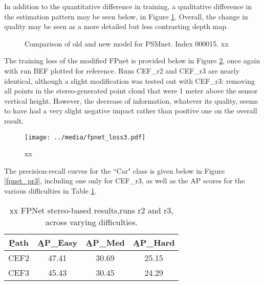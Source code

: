 In addition to the quantitative difference in training, a qualitative difference in the estimation pattern may be seen below, in Figure \ref{new_psmnet}. Overall, the change in quality may be seen as a more detailed but less contrasting depth map.

\begin{figure}[H]
	\centering
	\caption{Comparison of old and new model for PSMnet. Index 000015. xx}
	\label{new_psmnet}
\end{figure}


The training loss of the modified FPnet is provided below in Figure \ref{fpnet_loss3}, once again with run BEF plotted for reference. Runs CEF\_r2 and CEF\_r3 are nearly identical, although a slight modification was tested out with CEF\_r3: removing all points in the stereo-generated point cloud that were 1 meter above the sensor vertical height. However, the decrease of information, whatever its quality, seems to have had a very slight negative impact rather than positive one on the overall result.

\begin{figure}[ht]
	\centering
	\texttt{[image: ../media/fpnet\_loss3.pdf]}
	\caption{xx}
	\label{fpnet_loss3}
\end{figure}


The precision-recall curves for the ``Car" class is given below in Figure \ref{fpnet_pr3}, including one only for CEF\_r3, as well as the AP scores for the various difficulties in Table \ref{fpnet_ap3}.

\begin{table}[ht]
	\centering
	\caption{xx FPNet stereo-based results,runs r2 and r3, across varying difficulties.}
	\begin{tabular}{|c|c|c|c|}
		\hline
		\b{Path} & \b{AP\_Easy} & \b{AP\_Med} & \b{AP\_Hard} \\ \hline
		CEF2   &    47.41     &    30.69    &    25.15       \\ \hline
		CEF3   &    45.43     &    30.45    &    24.29       \\ \hline
	\end{tabular}
	\label{fpnet_ap3}
\end{table}

